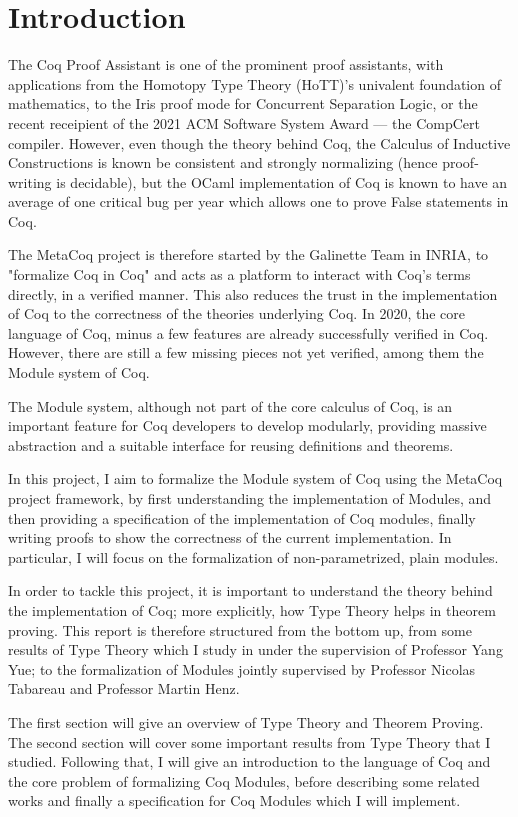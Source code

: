 \chapter{Introduction}

The Coq Proof Assistant is one of the prominent proof assistants, with
applications from the Homotopy Type Theory (HoTT)'s univalent foundation of
mathematics, to the Iris proof mode for Concurrent Separation Logic, or the
recent receipient of the 2021 ACM Software System Award --- the CompCert
compiler.  However, even though the theory behind Coq, the Calculus of Inductive
Constructions is known be consistent and strongly normalizing (hence
proof-writing is decidable), but the OCaml implementation of Coq is known to
have an average of one critical bug per year which allows one to prove False
statements in Coq.

The MetaCoq project is therefore started by the Galinette Team in INRIA, to 
"formalize Coq in Coq" and acts as a platform to interact with Coq's terms
directly, in a verified manner. This also reduces the trust in the
implementation of Coq to the correctness of the theories underlying Coq. In
2020, the core language of Coq, minus a few features are already successfully
verified in Coq. However, there are still a few missing pieces not yet verified,
among them the Module system of Coq.

The Module system, although not part of the core calculus of Coq, is an
important feature for Coq developers to develop modularly, providing massive
abstraction and a suitable interface for reusing definitions and theorems.

In this project, I aim to formalize the Module system of Coq using the MetaCoq
project framework, by first understanding the implementation of Modules, and
then providing a specification of the implementation of Coq modules, finally 
writing proofs to show the correctness of the current implementation.
In particular, I will focus on the formalization of non-parametrized, plain
modules.

In order to tackle this project, it is important to understand the theory behind
the implementation of Coq; more explicitly, how Type Theory helps in theorem 
proving. This report is therefore structured from the bottom up, from some
results of Type Theory which I study in under the supervision of Professor Yang
Yue; to the formalization of Modules jointly supervised by Professor Nicolas 
Tabareau and Professor Martin Henz.

The first section will give an overview of Type Theory and Theorem Proving.
The second section will cover some important results from Type Theory that I
studied. Following that, I will give an introduction to the language of Coq and
the core problem of formalizing Coq Modules, before describing some related
works and finally a specification for Coq Modules which I will implement.